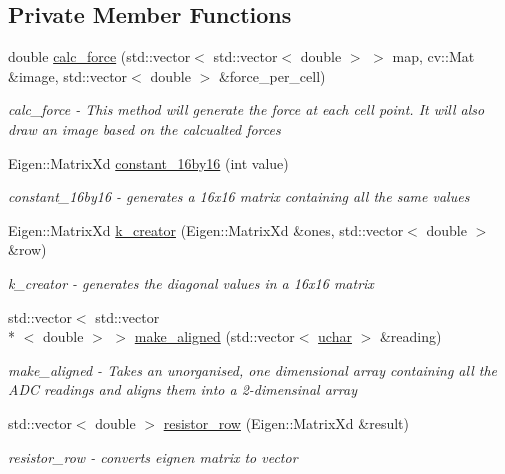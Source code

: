 \subsection*{Private Member Functions}
\begin{DoxyCompactItemize}
\item 
double \hyperlink{classforce__generator_a72718e6ff680ecc14ff9a27a5aa62293}{calc\-\_\-force} (std\-::vector$<$ std\-::vector$<$ double $>$ $>$ map, cv\-::\-Mat \&image, std\-::vector$<$ double $>$ \&force\-\_\-per\-\_\-cell)
\begin{DoxyCompactList}\small\item\em calc\-\_\-force -\/ This method will generate the force at each cell point. It will also draw an image based on the calcualted forces \end{DoxyCompactList}\item 
Eigen\-::\-Matrix\-Xd \hyperlink{classforce__generator_afa6c61de487ad4a850bfa4d5944577d6}{constant\-\_\-16by16} (int value)
\begin{DoxyCompactList}\small\item\em constant\-\_\-16by16 -\/ generates a 16x16 matrix containing all the same values \end{DoxyCompactList}\item 
Eigen\-::\-Matrix\-Xd \hyperlink{classforce__generator_ad86145a676a0c5ec67e6418188cbcf3f}{k\-\_\-creator} (Eigen\-::\-Matrix\-Xd \&ones, std\-::vector$<$ double $>$ \&row)
\begin{DoxyCompactList}\small\item\em k\-\_\-creator -\/ generates the diagonal values in a 16x16 matrix \end{DoxyCompactList}\item 
std\-::vector$<$ std\-::vector\\*
$<$ double $>$ $>$ \hyperlink{classforce__generator_a63267472044d217b55c860a724c1bc0e}{make\-\_\-aligned} (std\-::vector$<$ \hyperlink{force__generator_8h_a65f85814a8290f9797005d3b28e7e5fc}{uchar} $>$ \&reading)
\begin{DoxyCompactList}\small\item\em make\-\_\-aligned -\/ Takes an unorganised, one dimensional array containing all the A\-D\-C readings and aligns them into a 2-\/dimensinal array \end{DoxyCompactList}\item 
std\-::vector$<$ double $>$ \hyperlink{classforce__generator_af06c821901fb552457b738c4b18e41a7}{resistor\-\_\-row} (Eigen\-::\-Matrix\-Xd \&result)
\begin{DoxyCompactList}\small\item\em resistor\-\_\-row -\/ converts eignen matrix to vector \end{DoxyCompactList}\item 

\end{DoxyCompactItemize}
